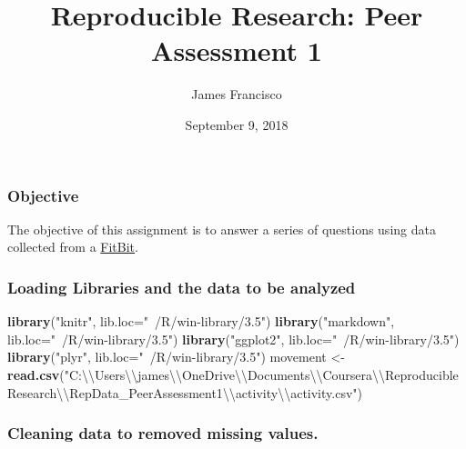 \documentclass[]{article}
\title{Reproducible Research: Peer Assessment 1}
\author{James Francisco}
\date{September 9, 2018}
\newenvironment{Shaded}{\begin{snugshade}}{\end{snugshade}}
\newcommand{\KeywordTok}[1]{\textcolor[rgb]{0.13,0.29,0.53}{\textbf{#1}}}
\newcommand{\DataTypeTok}[1]{\textcolor[rgb]{0.13,0.29,0.53}{#1}}
\newcommand{\CharTok}[1]{\textcolor[rgb]{0.31,0.60,0.02}{#1}}
\newcommand{\StringTok}[1]{\textcolor[rgb]{0.31,0.60,0.02}{#1}}
\newcommand{\NormalTok}[1]{#1}
\begin{document}
\maketitle

\subsubsection{Objective}\label{objective}

The objective of this assignment is to answer a series of questions
using data collected from a
\href{http://en.wikipedia.org/wiki/Fitbit}{FitBit}.

\subsubsection{Loading Libraries and the data to be
analyzed}\label{loading-libraries-and-the-data-to-be-analyzed}

\begin{Shaded}
\begin{Highlighting}[]
\KeywordTok{library}\NormalTok{(}\StringTok{"knitr"}\NormalTok{, }\DataTypeTok{lib.loc=}\StringTok{"~/R/win-library/3.5"}\NormalTok{)}
\KeywordTok{library}\NormalTok{(}\StringTok{"markdown"}\NormalTok{, }\DataTypeTok{lib.loc=}\StringTok{"~/R/win-library/3.5"}\NormalTok{)}
\KeywordTok{library}\NormalTok{(}\StringTok{"ggplot2"}\NormalTok{, }\DataTypeTok{lib.loc=}\StringTok{"~/R/win-library/3.5"}\NormalTok{)}
\KeywordTok{library}\NormalTok{(}\StringTok{"plyr"}\NormalTok{, }\DataTypeTok{lib.loc=}\StringTok{"~/R/win-library/3.5"}\NormalTok{)}
\NormalTok{movement <-}\StringTok{ }\KeywordTok{read.csv}\NormalTok{(}\StringTok{"C:}\CharTok{\textbackslash{}\textbackslash{}}\StringTok{Users}\CharTok{\textbackslash{}\textbackslash{}}\StringTok{james}\CharTok{\textbackslash{}\textbackslash{}}\StringTok{OneDrive}\CharTok{\textbackslash{}\textbackslash{}}\StringTok{Documents}\CharTok{\textbackslash{}\textbackslash{}}\StringTok{Coursera}\CharTok{\textbackslash{}\textbackslash{}}\StringTok{Reproducible Research}\CharTok{\textbackslash{}\textbackslash{}}\StringTok{RepData_PeerAssessment1}\CharTok{\textbackslash{}\textbackslash{}}\StringTok{activity}\CharTok{\textbackslash{}\textbackslash{}}\StringTok{activity.csv"}\NormalTok{)}
\end{Highlighting}
\end{Shaded}

\subsubsection{Cleaning data to removed missing
values.}\label{cleaning-data-to-removed-missing-values.}
\end{document}
